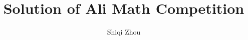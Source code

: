 \documentclass[12pt]{iopart}
\begin{document}
	
	
	\def\debproof{\noindent {\bf Proof.} }
	\def\finproof{\hfill {\small $\Box$} \\}
	\makeatletter %
	\makeatother  %
	\renewcommand\theequation{{\thesection}.{\arabic{equation}}}
	
\title[]{Solution of Ali Math Competition}
\author{ Shiqi Zhou }
\address{LSEC, Institute of Computational Mathematics, Academy of
	Mathematics and Systems Science, Chinese Academy of Sciences,
	Beijing 100190, China}



	\maketitle
	\newcommand{\eps}{\varepsilon}
	\newcommand{\RR}{\mathcal{R}}
	\newtheorem{lem}{Lemma}[section]
	\newtheorem{prop}{Proposition}[section]
	\newtheorem{cor}{Corollary}[section]
	\newtheorem{thm}{Theorem}[section]
	\newtheorem{rem}{Remark}[section]
	\newtheorem{alg}{Algorithm}[section]
	\newtheorem{assum}{Assumption}[section]
	\newtheorem{definition}{Definition}[section]
	
	
	\newcommand{\MyRoman}[1]{\rm\setcounter{RomanNumber}{#1}\Roman{RomanNumber}}
	
	\newcommand{\bL}{\mathbf{L}}
	\newcommand{\bH}{\mathbf{H}}
	\newcommand{\bW}{\mathbf{W}}
	\newcommand{\bP}{\mathbf{P}}
	\newcommand{\bQ}{\mathbf{Q}}
	\newcommand{\bp}{\mathbf{p}}
	\newcommand{\bq}{\mathbf{q}}
	\newcommand{\uL}{u_{_{\rm L}}}
	\newcommand{\vL}{v_{_{\rm L}}}
	\newcommand{\tuL}{\tilde u_{_{\rm L}}}
	\newcommand{\tvL}{\tilde v_{_{\rm L}}}
	\newcommand{\fL}{f_{_{\rm L}}}
	\newcommand{\gL}{g_{_{\rm L}}}
	\newcommand{\bpL}{\bp_{_{\rm L}}}
	\newcommand{\bqL}{\bq_{_{\rm L}}}
	\newcommand{\tbpL}{\tilde{\bp}_{_{\rm L}}}
	\newcommand{\tbqL}{\tilde{\bq}_{_{\rm L}}}
	\newcommand{\tbpLf}{\tilde{\bp}_{_{\rm L,1}}}
	\newcommand{\tbpLs}{\tilde{\bp}_{_{\rm L,2}}}
	\newcommand{\tbqLf}{\tilde{\bq}_{_{\rm L,1}}}
	\newcommand{\tbqLs}{\tilde{\bq}_{_{\rm L,2}}}
	\newcommand{\bn}{\nu}
	\newcommand{\bv}{\mathbf{v}}
	\newcommand{\om}{\omega}
	\newcommand{\pa}{\partial}
	\newcommand{\la}{\langle}
	\newcommand{\ra}{\rangle}
	\newcommand{\lla}{\la{\hskip -2pt}\la}
	\newcommand{\rra}{\ra{\hskip -2pt}\ra}
	\newcommand{\jj}{\|{\hskip -0.8pt} |}
	\newcommand{\al}{\alpha}
	\newcommand{\ze}{\zeta}
	\newcommand{\si}{\sigma}
	\newcommand{\ep}{\varepsilon}
	\newcommand{\na}{\nabla}
	\newcommand{\vp}{\varphi}
	\newcommand{\ga}{\gamma}
	\newcommand{\Ga}{\Gamma}
	\newcommand{\Om}{\Omega}
	\newcommand{\de}{\delta}
	\newcommand{\Th}{\Theta}
	\newcommand{\De}{\Delta}
	\newcommand{\Lam}{\Lambda}
	\newcommand{\lam}{\lambda}
	\newcommand{\tri}{\triangle}
	\newcommand{\lj}{[{\hskip -2pt} [}
	\newcommand{\rj}{]{\hskip -2pt} ]}
	\newcommand{\bks}{\backslash}
	\newcommand{\diam}{\mathrm{diam}}
	\newcommand{\osc}{\mathrm{osc}}
	\newcommand{\meas}{\mathrm{meas}}
	\newcommand{\dist}{\mathrm{dist}}
	
\end{document}
